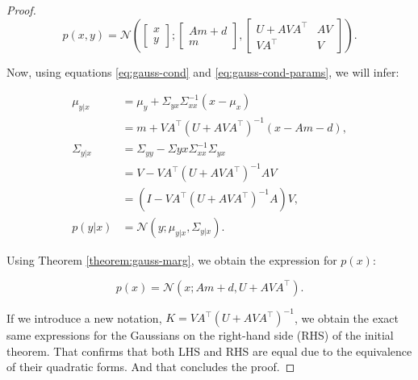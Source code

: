 \begin{proof}
    \begin{equation}
        p(x,y) = 
        \mathscr{N}\left(
            \begin{bmatrix}
                x \\
                y
            \end{bmatrix}
            ;
            \begin{bmatrix}
                Am + d \\
                m
            \end{bmatrix}
            ,
            \begin{bmatrix}
                U + A V A^\intercal & A V \\
                V A^\intercal & V
            \end{bmatrix}
        \right).
    \end{equation}

    Now, using equations \ref{eq:gauss-cond} and \ref{eq:gauss-cond-params}, we will infer:

    \begin{align}
        \mu_{y|x}
        &= \mu_y + \Sigma_{yx} \Sigma_{xx}^{-1}(x - \mu_x) \nonumber \\
        &= m + V A^\intercal (U + A V A^\intercal)^{-1}(x - Am - d), \\
        \Sigma_{y|x}
        &= \Sigma_{yy} - \Sigma{yx}\Sigma_{xx}^{-1}\Sigma_{yx} \nonumber \\
        &= V - V A^\intercal (U + A V A^\intercal)^{-1} A V \nonumber \\
        &= (I - V A^\intercal (U + A V A^\intercal)^{-1} A) V, \\
        p(y|x)
        &= \mathscr{N}\left(y; \mu_{y|x}, \Sigma_{y|x}\right).
    \end{align}

    Using Theorem \ref{theorem:gauss-marg}, we obtain the expression for $p(x)$:

    \begin{equation}
        p(x) = \mathscr{N}(x; Am + d, U + A V A^\intercal).
    \end{equation}

    If we introduce a new notation, $K = V A^\intercal (U + A V A^\intercal)^{-1}$, we obtain the exact same expressions for the Gaussians on the right-hand side (RHS) of the initial theorem. That confirms that both LHS and RHS are equal due to the equivalence of their quadratic forms. And that concludes the proof.
\end{proof}

